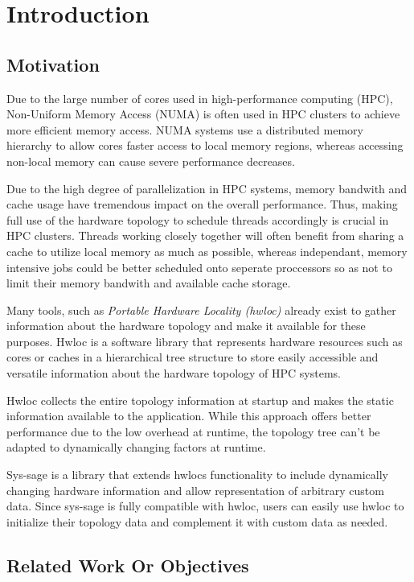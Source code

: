 \chapter{Introduction}\label{chapter:introduction}
\section{Motivation}

Due to the large number of cores used in high-performance computing (HPC), Non-Uniform Memory Access (NUMA) is often used in HPC clusters to achieve more efficient memory access.
NUMA systems use a distributed memory hierarchy to allow cores faster access to local memory regions, whereas accessing non-local memory can cause severe performance decreases. \cite{nuioa_intro}

Due to the high degree of parallelization in HPC systems, memory bandwith and cache usage have tremendous impact on the overall performance. \cite{openmp_intro}
Thus, making full use of the hardware topology to schedule threads accordingly is crucial in HPC clusters.
Threads working closely together will often benefit from sharing a cache to utilize local memory as much as possible,
whereas independant, memory intensive jobs could be better scheduled onto seperate proccessors so as not to limit their memory bandwith and available cache storage. \cite{hwloc_paper}

Many tools, such as \emph{Portable Hardware Locality (hwloc)} \cite{hwloc} already exist to gather information about the hardware topology and make it available for these purposes.
Hwloc is a software library that represents hardware resources such as cores or caches in a hierarchical tree structure
to store easily accessible and versatile information about the hardware topology of HPC systems. \cite{hwloc_paper}

Hwloc collects the entire topology information at startup and makes the static information available to the application. \cite{hwloc_paper}
While this approach offers better performance due to the low overhead at runtime, the topology tree can't be adapted to dynamically changing factors at runtime.

Sys-sage \cite{sys-sage} is a library that extends hwlocs functionality to include dynamically changing hardware information and allow representation of arbitrary custom data.
Since sys-sage is fully compatible with hwloc, users can easily use hwloc to initialize their topology data and complement it with custom data as needed.

\section{Related Work Or Objectives}
